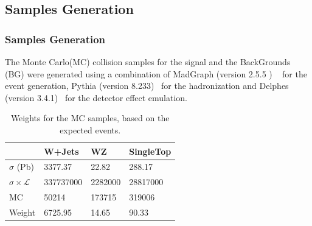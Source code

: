 \documentclass{beamer}
\begin{document}
\begin{frame}
\section{Samples Generation}
\frametitle{Samples Generation}
\begin{justify}
	The Monte Carlo(MC) collision samples for the signal and the BackGrounds (BG) were generated using a combination of MadGraph (version 2.5.5 ) ~%
 for the event generation, Pythia (version 8.233)~  %
for the hadronization and Delphes (version 3.4.1)~  %
for the detector effect emulation.
\end{justify}
\begin{table}[]
	{\centering
		\begin{tabular}{llll}
			\hline
										& \textbf{W+Jets}	& \textbf{WZ}	& \textbf{SingleTop}	\\\hline
			$\sigma$ (Pb) 				& 3377.37    		& 22.82       	& 288.17     			\\
			$\sigma\times\mathcal{L}$   & 337737000   		& 2282000     	& 28817000   			\\
			MC            				& 50214     		& 173715      	& 319006      			\\
			Weight        				& 6725.95 			& 14.65 		& 90.33					\\\hline
		
		\end{tabular}
		
		\caption{Weights for the MC samples, based on the expected events.}
		\label{WeightsSamplesTable}
	}
\end{table}

\end{frame}

\end{document}
